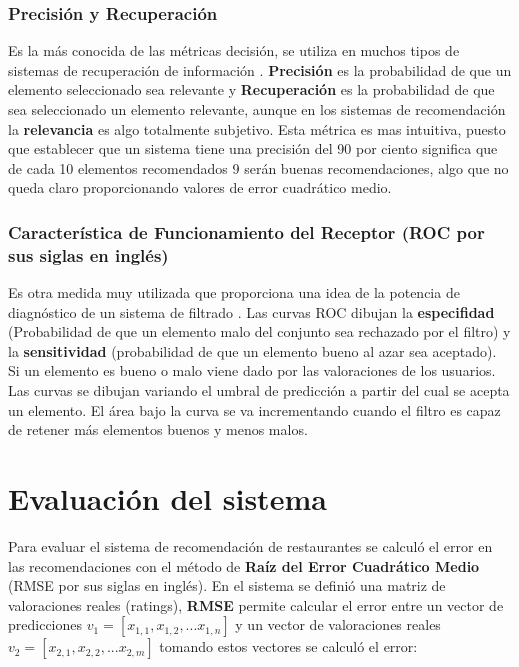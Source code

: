 \documentclass[12pt,letterpaper,oneside] {memoir}
\begin{document}
\subsubsection{Precisión y Recuperación}

Es la más conocida de las métricas decisión, se utiliza en muchos tipos de sistemas de recuperación de información \citep{Herlocker2004, Sarwar2001, Basu1998, Billsus1998}. \textbf{Precisión} es la probabilidad de que un elemento seleccionado sea relevante y \textbf{Recuperación} es la probabilidad de que sea seleccionado un elemento relevante, aunque en los sistemas de recomendación la \textbf{relevancia} es algo totalmente subjetivo. Esta métrica es mas intuitiva, puesto que establecer que un sistema tiene una precisión del 90 por ciento significa que de cada 10 elementos recomendados 9 serán buenas recomendaciones, algo que no queda claro proporcionando valores de error cuadrático medio.

\subsubsection{Característica de Funcionamiento del Receptor (ROC por sus siglas en inglés)}

 Es otra medida muy utilizada que proporciona una idea de la potencia de diagnóstico de un sistema de filtrado \citep{Hanley1982, Herlocker2004}. Las curvas ROC dibujan la  \textbf{especifidad} (Probabilidad de que un elemento malo del conjunto sea rechazado por el filtro) y la  \textbf{sensitividad} (probabilidad de que un elemento bueno al azar sea aceptado). Si un elemento es bueno o malo viene dado por las valoraciones de los usuarios. Las curvas se dibujan variando el umbral de predicción a partir del cual se acepta un elemento. El área bajo la curva se va incrementando cuando el filtro es capaz de retener más elementos buenos y menos malos.

\section{Evaluación del sistema}
Para evaluar el sistema de recomendación de restaurantes se calculó el error en las recomendaciones con el método de \textbf{Raíz del Error Cuadrático Medio} (RMSE por sus siglas en inglés).  En el sistema se definió una matriz de valoraciones reales (ratings), \textbf{RMSE} permite calcular el error entre un vector de predicciones \textit{$\displaystyle v_{1}= [x_{1,1},x_{1,2},...x_{1,n}]$} y un vector de valoraciones reales \textit{$\displaystyle v_{2}= [x_{2,1},x_{2,2},...x_{2,m}]$} tomando estos vectores se calculó el error:
\end{document}
